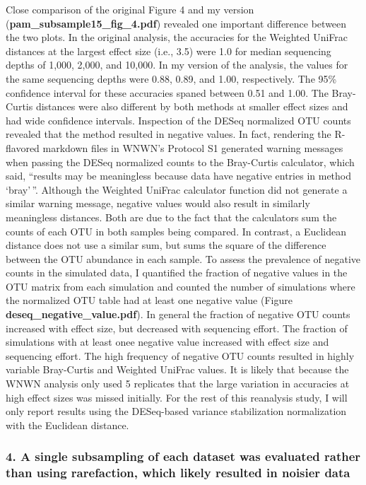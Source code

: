 \documentclass[
]{article}
\begin{document}
Close comparison of the original Figure 4 and my version
(\textbf{pam\_subsample15\_fig\_4.pdf}) revealed one important
difference between the two plots. In the original analysis, the
accuracies for the Weighted UniFrac distances at the largest effect size
(i.e., 3.5) were 1.0 for median sequencing depths of 1,000, 2,000, and
10,000. In my version of the analysis, the values for the same
sequencing depths were 0.88, 0.89, and 1.00, respectively. The 95\%
confidence interval for these accuracies spaned between 0.51 and 1.00.
The Bray-Curtis distances were also different by both methods at smaller
effect sizes and had wide confidence intervals. Inspection of the DESeq
normalized OTU counts revealed that the method resulted in negative
values. In fact, rendering the R-flavored markdown files in WNWN's
Protocol S1 generated warning messages when passing the DESeq normalized
counts to the Bray-Curtis calculator, which said, ``results may be
meaningless because data have negative entries in method `bray'\,''.
Although the Weighted UniFrac calculator function did not generate a
similar warning message, negative values would also result in similarly
meaningless distances. Both are due to the fact that the calculators sum
the counts of each OTU in both samples being compared. In contrast, a
Euclidean distance does not use a similar sum, but sums the square of
the difference between the OTU abundance in each sample. To assess the
prevalence of negative counts in the simulated data, I quantified the
fraction of negative values in the OTU matrix from each simulation and
counted the number of simulations where the normalized OTU table had at
least one negative value (Figure \textbf{deseq\_negative\_value.pdf}).
In general the fraction of negative OTU counts increased with effect
size, but decreased with sequencing effort. The fraction of simulations
with at least onee negative value increased with effect size and
sequencing effort. The high frequency of negative OTU counts resulted in
highly variable Bray-Curtis and Weighted UniFrac values. It is likely
that because the WNWN analysis only used 5 replicates that the large
variation in accuracies at high effect sizes was missed initially. For
the rest of this reanalysis study, I will only report results using the
DESeq-based variance stabilization normalization with the Euclidean
distance.

\hypertarget{a-single-subsampling-of-each-dataset-was-evaluated-rather-than-using-rarefaction-which-likely-resulted-in-noisier-data}{%
\subsubsection{4. A single subsampling of each dataset was evaluated
rather than using rarefaction, which likely resulted in noisier
data}\label{a-single-subsampling-of-each-dataset-was-evaluated-rather-than-using-rarefaction-which-likely-resulted-in-noisier-data}}
\end{document}

